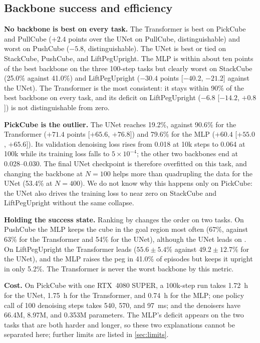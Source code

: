 \subsection{Backbone success and efficiency}
\label{sec:backbone}

\textbf{No backbone is best on every task.} The Transformer is best on
PickCube and PullCube ($+2.4$ points over the UNet on PullCube,
distinguishable) and worst on PushCube ($-5.8$, distinguishable). The UNet is
best or tied on StackCube, PushCube, and LiftPegUpright. The MLP is within
about ten points of the best backbone on the three 100-step tasks but clearly
worst on StackCube (25.0\% against 41.0\%) and LiftPegUpright
($-30.4$ points [$-40.2$, $-21.2$] against the UNet). The Transformer is the
most consistent: it stays within 90\% of the best backbone on every task, and
its deficit on LiftPegUpright ($-6.8$ [$-14.2$, $+0.8$]) is not
distinguishable from zero.

\textbf{PickCube is the outlier.} The UNet reaches 19.2\%, against 90.6\% for
the Transformer ($+71.4$ points [$+65.6$, $+76.8$]) and 79.6\% for the MLP
($+60.4$ [$+55.0$, $+65.6$]). Its validation denoising loss rises from 0.018
at 10k steps to 0.064 at 100k while its training loss falls to
$5\times10^{-4}$; the other two backbones end at 0.028--0.030. The final UNet
checkpoint is therefore overfitted on this task, and changing the backbone at
$N=100$ helps more than quadrupling the data for the UNet (53.4\% at $N=400$).
We do not know why this happens only on PickCube: the UNet also drives the
training loss to near zero on StackCube and LiftPegUpright without the same
collapse.

\textbf{Holding the success state.} Ranking by \metricend{} changes the order
on two tasks. On PushCube the MLP keeps the cube in the goal region most often
(67\%, against 63\% for the Transformer and 54\% for the UNet), although the
UNet leads on \metriconce{}. On LiftPegUpright the Transformer leads
($55.6\pm5.4$\% against $49.2\pm12.7$\% for the UNet), and the MLP raises the
peg in 41.0\% of episodes but keeps it upright in only 5.2\%. The Transformer
is never the worst backbone by this metric.

\textbf{Cost.} On PickCube with one RTX~4080 SUPER, a 100k-step run takes
1.72~h for the UNet, 1.75~h for the Transformer, and 0.74~h for the MLP; one
policy call of 100 denoising steps takes 540, 570, and 97~ms; and the
denoisers have 66.4M, 8.97M, and 0.353M parameters. The MLP's deficit appears
on the two tasks that are both harder and longer, so these two explanations
cannot be separated here; further limits are listed in \cref{sec:limits}.

